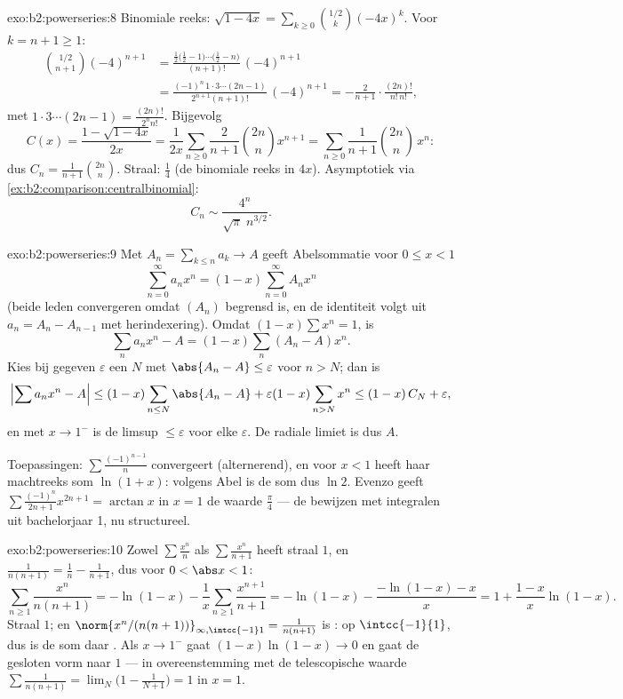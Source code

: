 \begin{solution}{exo:b2:powerseries:8}
Binomiale reeks: $\sqrt{1-4x} = \sum_{k\geq0}
\binom{1/2}{k}(-4x)^k$. Voor $k = n + 1 \geq 1$:
\begin{align*}
\binom{1/2}{n+1}(-4)^{n+1}
&= \frac{\frac12\bigl(\frac12 - 1\bigr)\cdots\bigl(\frac12 -
n\bigr)}{(n+1)!}\,(-4)^{n+1}\\
&= \frac{(-1)^n\,1\cdot3\cdots(2n-1)}{2^{n+1}(n+1)!}\,(-4)^{n+1}
= -\frac{2}{n+1}\cdot\frac{(2n)!}{n!\,n!} ,
\end{align*}
met $1\cdot3\cdots(2n-1) = \frac{(2n)!}{2^n n!}$. Bijgevolg
\[
C(x) = \frac{1 - \sqrt{1-4x}}{2x}
= \frac{1}{2x}\sum_{n\geq0}\frac{2}{n+1}\binom{2n}{n}x^{n+1}
= \sum_{n\geq0} \frac{1}{n+1}\binom{2n}{n}\,x^n :
\]
dus $C_n = \frac{1}{n+1}\binom{2n}{n}$. Straal: $\frac14$ (de
binomiale reeks in $4x$). Asymptotiek via
\cref{ex:b2:comparison:centralbinomial}:
\[
C_n \sim \frac{4^n}{\sqrt{\pi}\; n^{3/2}} .
\]
\end{solution}

\begin{solution}{exo:b2:powerseries:9}
Met $A_n = \sum_{k \leq n} a_k \to A$ geeft Abelsommatie voor $0
\leq x < 1$
\[
\sum_{n=0}^{\infty} a_n x^n = (1 - x)\sum_{n=0}^{\infty} A_n x^n
\]
(beide leden convergeren omdat $(A_n)$ begrensd is, en de
identiteit volgt uit $a_n = A_n - A_{n-1}$ met herindexering).
Omdat $(1 - x)\sum x^n = 1$, is
\[
\sum_n a_nx^n - A = (1-x)\sum_{n} (A_n - A)x^n .
\]
Kies bij gegeven $\varepsilon$ een $N$ met $\abs{A_n - A} \leq
\varepsilon$ voor $n > N$; dan is
\[
\Bigl|\sum a_nx^n - A\Bigr|
\leq (1-x)\sum_{n \leq N}\abs{A_n - A} + \varepsilon(1 -
x)\sum_{n > N}x^n
\leq (1-x)\,C_N + \varepsilon ,
\]
en met $x \to 1^-$ is de limsup $\leq \varepsilon$ voor elke
$\varepsilon$. De radiale limiet is dus $A$.

Toepassingen: $\sum \frac{(-1)^{n-1}}{n}$ convergeert
(alternerend), en voor $x < 1$ heeft haar machtreeks som $\ln(1 +
x)$: volgens Abel is de som dus $\ln 2$. Evenzo geeft
$\sum\frac{(-1)^n}{2n+1}x^{2n+1} = \arctan x$ in $x = 1$ de waarde
$\frac\pi4$ --- de bewijzen met integralen uit bachelorjaar 1, nu
structureel.
\end{solution}

\begin{solution}{exo:b2:powerseries:10}
Zowel $\sum\frac{x^n}{n}$ als $\sum\frac{x^n}{n+1}$ heeft straal
$1$, en $\frac{1}{n(n+1)} = \frac1n - \frac1{n+1}$, dus voor $0 <
\abs x < 1$:
\[
\sum_{n\geq1}\frac{x^n}{n(n+1)}
= -\ln(1-x) - \frac1x\sum_{n\geq1}\frac{x^{n+1}}{n+1}
= -\ln(1-x) - \frac{-\ln(1-x) - x}{x}
= 1 + \frac{1-x}{x}\ln(1-x) .
\]
Straal $1$; en $\norm{x^n/(n(n+1))}_{\infty,\intcc{-1}1} =
\frac{1}{n(n+1)}$ is :  op
$\intcc{-1}{1}$, dus is de som daar . Als $x \to 1^-$ gaat
$(1-x)\ln(1-x) \to 0$ en gaat de gesloten vorm naar $1$ --- in
overeenstemming met de telescopische waarde
$\sum\frac{1}{n(n+1)} = \lim_N\bigl(1 - \frac{1}{N+1}\bigr) = 1$
in $x = 1$.
\end{solution}

